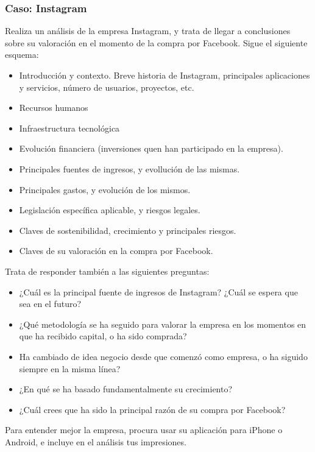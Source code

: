 \documentclass[a4paper,12pt]{article}
\begin{document}
\subsubsection{Caso: Instagram}
\label{sub:case-instagram}

Realiza un análisis de la empresa Instagram, y trata de llegar a conclusiones sobre su valoración en el momento de la compra por Facebook. Sigue el siguiente esquema:

\begin{itemize}
\item Introducción y contexto. Breve historia de Instagram, principales aplicaciones y servicios, número de usuarios, proyectos, etc.
\item Recursos humanos
\item Infraestructura tecnológica
\item Evolución financiera (inversiones quen han participado en la empresa).
\item Principales fuentes de ingresos, y evollución de las mismas.
\item Principales gastos, y evolución de los mismos.
\item Legislación específica aplicable, y riesgos legales.
\item Claves de sostenibilidad, crecimiento y principales riesgos.
\item Claves de su valoración en la compra por Facebook.
\end{itemize}

Trata de responder también a las siguientes preguntas:

\begin{itemize}
\item ¿Cuál es la principal fuente de ingresos de Instagram? ¿Cuál se espera que sea en el futuro?
\item ¿Qué metodología se ha seguido para valorar la empresa en los momentos en que ha recibido capital, o ha sido comprada?
\item Ha cambiado de idea negocio desde que comenzó como empresa, o ha siguido siempre en la misma línea?
\item ¿En qué se ha basado fundamentalmente su crecimiento?
\item ¿Cuál crees que ha sido la principal razón de su compra por Facebook?
\end{itemize}

Para entender mejor la empresa, procura usar su aplicación para iPhone o Android, e incluye en el análisis tus impresiones.
\end{document}

